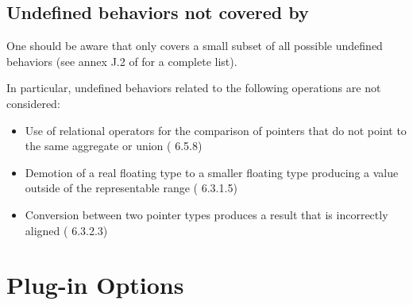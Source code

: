 \section{Undefined behaviors not covered by \rte{}}

One should be aware that \rte{} only covers a small subset of all possible
undefined behaviors (see annex J.2 of \cite{standardc99} for a complete list).

In particular, undefined behaviors related to the following operations are not
considered:

\begin{itemize}
\item Use of relational operators for the comparison of pointers that do not
  point to the same aggregate or union (\cnn{} 6.5.8)
\item Demotion of a real floating type to a smaller floating type
  producing a value outside of the representable range (\cnn{} 6.3.1.5)
\item Conversion between two pointer types produces a result that is incorrectly
  aligned (\cnn{} 6.3.2.3)
\end{itemize}


\chapter{Plug-in Options}


